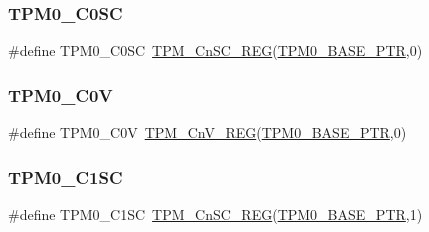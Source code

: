 \subsubsection{\texorpdfstring{T\+P\+M0\+\_\+\+C0\+SC}{TPM0\_C0SC}}
{\footnotesize\ttfamily \#define T\+P\+M0\+\_\+\+C0\+SC~\hyperlink{group___t_p_m___register___accessor___macros_gaa96e657221c499960f64bc004e348b6c}{T\+P\+M\+\_\+\+Cn\+S\+C\+\_\+\+R\+EG}(\hyperlink{group___t_p_m___peripheral_ga8ba6c6fb69345639750108c3289a24c4}{T\+P\+M0\+\_\+\+B\+A\+S\+E\+\_\+\+P\+TR},0)}

\mbox{\label{group___t_p_m___register___accessor___macros_ga6972e3980441d1fc526a72bfe4eae7bf}} 
\subsubsection{\texorpdfstring{T\+P\+M0\+\_\+\+C0V}{TPM0\_C0V}}
{\footnotesize\ttfamily \#define T\+P\+M0\+\_\+\+C0V~\hyperlink{group___t_p_m___register___accessor___macros_gaf87163e32c337d1f46724110a85e8ea2}{T\+P\+M\+\_\+\+Cn\+V\+\_\+\+R\+EG}(\hyperlink{group___t_p_m___peripheral_ga8ba6c6fb69345639750108c3289a24c4}{T\+P\+M0\+\_\+\+B\+A\+S\+E\+\_\+\+P\+TR},0)}

\mbox{\label{group___t_p_m___register___accessor___macros_gaa8f7313723db2881d7de617dbb16b4e6}} 
\subsubsection{\texorpdfstring{T\+P\+M0\+\_\+\+C1\+SC}{TPM0\_C1SC}}
{\footnotesize\ttfamily \#define T\+P\+M0\+\_\+\+C1\+SC~\hyperlink{group___t_p_m___register___accessor___macros_gaa96e657221c499960f64bc004e348b6c}{T\+P\+M\+\_\+\+Cn\+S\+C\+\_\+\+R\+EG}(\hyperlink{group___t_p_m___peripheral_ga8ba6c6fb69345639750108c3289a24c4}{T\+P\+M0\+\_\+\+B\+A\+S\+E\+\_\+\+P\+TR},1)}

